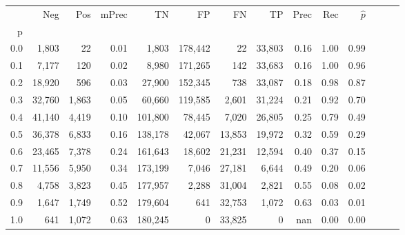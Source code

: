 \begin{tabular}{rrrrrrrrrrrrrr}
\toprule
{} &     Neg &    Pos & mPrec &       TN &       FP &      FN &      TP &  Prec &   Rec & $\hat{p}$ \\
p   &         &        &       &          &          &         &         &       &       &           \\
\midrule
0.0 &   1,803 &     22 &  0.01 &    1,803 &  178,442 &      22 &  33,803 &  0.16 &  1.00 &      0.99 \\
0.1 &   7,177 &    120 &  0.02 &    8,980 &  171,265 &     142 &  33,683 &  0.16 &  1.00 &      0.96 \\
0.2 &  18,920 &    596 &  0.03 &   27,900 &  152,345 &     738 &  33,087 &  0.18 &  0.98 &      0.87 \\
0.3 &  32,760 &  1,863 &  0.05 &   60,660 &  119,585 &   2,601 &  31,224 &  0.21 &  0.92 &      0.70 \\
0.4 &  41,140 &  4,419 &  0.10 &  101,800 &   78,445 &   7,020 &  26,805 &  0.25 &  0.79 &      0.49 \\
0.5 &  36,378 &  6,833 &  0.16 &  138,178 &   42,067 &  13,853 &  19,972 &  0.32 &  0.59 &      0.29 \\
0.6 &  23,465 &  7,378 &  0.24 &  161,643 &   18,602 &  21,231 &  12,594 &  0.40 &  0.37 &      0.15 \\
0.7 &  11,556 &  5,950 &  0.34 &  173,199 &    7,046 &  27,181 &   6,644 &  0.49 &  0.20 &      0.06 \\
0.8 &   4,758 &  3,823 &  0.45 &  177,957 &    2,288 &  31,004 &   2,821 &  0.55 &  0.08 &      0.02 \\
0.9 &   1,647 &  1,749 &  0.52 &  179,604 &      641 &  32,753 &   1,072 &  0.63 &  0.03 &      0.01 \\
1.0 &     641 &  1,072 &  0.63 &  180,245 &        0 &  33,825 &       0 &   nan &  0.00 &      0.00 \\
\bottomrule
\end{tabular}
